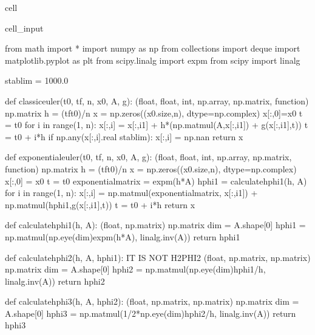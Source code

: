 \documentclass[letterpaper,10pt,english]{jupyterBook}
\begin{document}
\begin{sphinxuseclass}{cell}\begin{sphinxVerbatimInput}

\begin{sphinxuseclass}{cell_input}
\begin{sphinxVerbatim}[commandchars=\\\{\}]
from math import *
import numpy as np
from collections import deque
import matplotlib.pyplot as plt
from scipy.linalg import expm
from scipy import linalg

stab\PYGZus{}lim = 1000.0

def classic\PYGZus{}euler(t0, tf, n, x0, A, g):
    \PYGZsq{}\PYGZsq{}\PYGZsq{}(float, float, int, np.array, np.matrix, function) \PYGZhy{}\PYGZgt{} np.matrix\PYGZsq{}\PYGZsq{}\PYGZsq{}
    h = (tf\PYGZhy{}t0)/n
    x = np.zeros((x0.size,n), dtype=np.complex\PYGZus{})
    x[:,0]=x0
    t = t0
    for i in range(1, n):
        x[:,i] = x[:,i\PYGZhy{}1] + h*(np.matmul(\PYGZhy{}A,x[:,i\PYGZhy{}1]) + g(x[:,i\PYGZhy{}1],t))
        t = t0 + i*h
        if np.any(x[:,i].real \PYGZgt{} stab\PYGZus{}lim):
            x[:,i] = np.nan
    return x

def exponential\PYGZus{}euler(t0, tf, n, x0, A, g):
    \PYGZsq{}\PYGZsq{}\PYGZsq{}(float, float, int, np.array, np.matrix, function) \PYGZhy{}\PYGZgt{} np.matrix\PYGZsq{}\PYGZsq{}\PYGZsq{}
    h = (tf\PYGZhy{}t0)/n
    x = np.zeros((x0.size,n), dtype=np.complex\PYGZus{})
    x[:,0] = x0
    t = t0
    exponential\PYGZus{}matrix = expm(\PYGZhy{}h*A)
    hphi1 = calculate\PYGZus{}hphi1(h, A)
    for i in range(1, n):
        x[:,i] = np.matmul(exponential\PYGZus{}matrix, x[:,i\PYGZhy{}1]) + np.matmul(hphi1,g(x[:,i\PYGZhy{}1],t))
        t = t0 + i*h
    return x

def calculate\PYGZus{}hphi1(h, A):
  \PYGZsq{}\PYGZsq{}\PYGZsq{}(float, np.matrix) \PYGZhy{}\PYGZgt{} np.matrix\PYGZsq{}\PYGZsq{}\PYGZsq{}
  dim = A.shape[0]
  hphi1 = np.matmul(np.eye(dim)\PYGZhy{}expm(\PYGZhy{}h*A), linalg.inv(A))
  return hphi1

def calculate\PYGZus{}hphi2(h, A, hphi1):
    \PYGZsh{}IT IS NOT H2PHI2
    \PYGZsq{}\PYGZsq{}\PYGZsq{}(float, np.matrix, np.matrix) \PYGZhy{}\PYGZgt{} np.matrix\PYGZsq{}\PYGZsq{}\PYGZsq{}
    dim = A.shape[0]
    hphi2 = np.matmul(np.eye(dim)\PYGZhy{}hphi1/h, linalg.inv(A))
    return hphi2

def calculate\PYGZus{}hphi3(h, A, hphi2):
    \PYGZsq{}\PYGZsq{}\PYGZsq{}(float, np.matrix, np.matrix) \PYGZhy{}\PYGZgt{} np.matrix\PYGZsq{}\PYGZsq{}\PYGZsq{}
    dim = A.shape[0]
    hphi3 = np.matmul(1/2*np.eye(dim)\PYGZhy{}hphi2/h, linalg.inv(A))
    return hphi3


\end{sphinxVerbatim}
\end{sphinxuseclass}
\end{sphinxVerbatimInput}
\end{sphinxuseclass}
\end{document}
